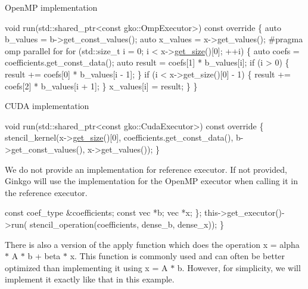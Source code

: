 Open\+MP implementation


\begin{DoxyCode}
            \textcolor{keywordtype}{void} run(std::shared\_ptr<const gko::OmpExecutor>)\textcolor{keyword}{ const override}
\textcolor{keyword}{            }\{
                \textcolor{keyword}{auto} b\_values = b->get\_const\_values();
                \textcolor{keyword}{auto} x\_values = x->get\_values();
\textcolor{preprocessor}{#pragma omp parallel for}
                \textcolor{keywordflow}{for} (std::size\_t i = 0; i < x->\hyperlink{classgko_1_1LinOp_a31b3c003388eb0b95393154f68c2b98d}{get\_size}()[0]; ++i) \{
                    \textcolor{keyword}{auto} coefs = coefficients.get\_const\_data();
                    \textcolor{keyword}{auto} result = coefs[1] * b\_values[i];
                    \textcolor{keywordflow}{if} (i > 0) \{
                        result += coefs[0] * b\_values[i - 1];
                    \}
                    \textcolor{keywordflow}{if} (i < x->get\_size()[0] - 1) \{
                        result += coefs[2] * b\_values[i + 1];
                    \}
                    x\_values[i] = result;
                \}
            \}
\end{DoxyCode}


C\+U\+DA implementation


\begin{DoxyCode}
\textcolor{keywordtype}{void} run(std::shared\_ptr<const gko::CudaExecutor>)\textcolor{keyword}{ const override}
\textcolor{keyword}{}\{
    stencil\_kernel(x->\hyperlink{classgko_1_1LinOp_a31b3c003388eb0b95393154f68c2b98d}{get\_size}()[0], coefficients.get\_const\_data(),
                   b->get\_const\_values(), x->get\_values());
\}
\end{DoxyCode}


We do not provide an implementation for reference executor. If not provided, Ginkgo will use the implementation for the Open\+MP executor when calling it in the reference executor.


\begin{DoxyCode}
        \textcolor{keyword}{const} coef\_type &coefficients;
        \textcolor{keyword}{const} vec *b;
        vec *x;
    \};
    this->get\_executor()->run(
        stencil\_operation(coefficients, dense\_b, dense\_x));
\}
\end{DoxyCode}


There is also a version of the apply function which does the operation x = alpha $\ast$ A $\ast$ b + beta $\ast$ x. This function is commonly used and can often be better optimized than implementing it using x = A $\ast$ b. However, for simplicity, we will implement it exactly like that in this example.


